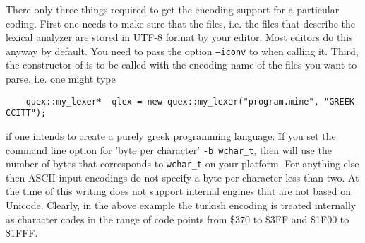 There only three things required to get the encoding support for a particular coding. First
one needs to make sure that the {\quex} files, i.e. the files that describe the lexical
analyzer are stored in UTF-8 format by your editor. Most editors do this anyway by default.
You need to pass the option {\tt --iconv} to {\quex} when calling it. Third, the constructor
of {\quex} is to be called with the encoding name of the files you want to parse, i.e. one might
type

\begin{lstlisting}
    quex::my_lexer*  qlex = new quex::my_lexer("program.mine", "GREEK-CCITT");
\end{lstlisting}

if one intends to create a purely greek programming language. If you set the command
line option for 'byte per character' {\tt -b wchar\_t}, then {\quex} will use
the number of bytes that corresponds to {\tt wchar\_t} on your platform. For
anything else then ASCII input encodings do not specify a byte per character
less than two.  At the time of this writing {\quex} does not support internal
engines that are not based on Unicode. Clearly, in the above example the turkish
encoding is treated internally as character codes in the range of code points from 
\$370 to \$3FF and \$1F00 to \$1FFF.
